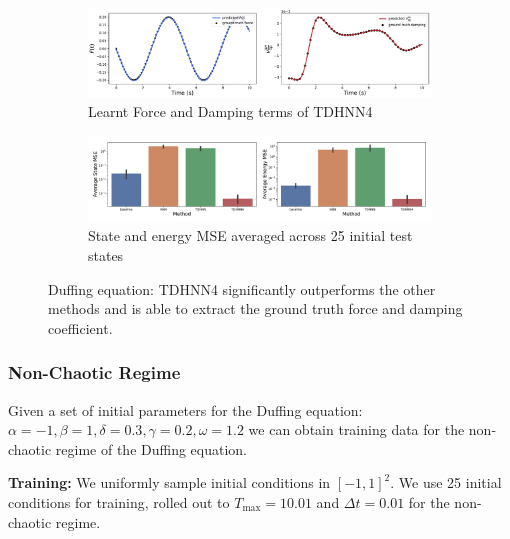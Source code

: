 \documentclass{article}
\begin{document}
\begin{figure}[h!]
\centering
\captionsetup{justification=centering}
	\begin{subfigure}[b]{0.48\textwidth}
		\centering
		\includegraphics[width=\textwidth]{figures/figures/duffing/1/duffing_dpdt_new_0.pdf}
		\caption{Learnt Force and Damping terms of TDHNN4}
	\end{subfigure}
	\begin{subfigure}[b]{0.48\textwidth}
	    \centering
		\includegraphics[width=\textwidth]{figures/figures/duffing/1/duffing_errors_0.pdf}
		\caption{State and energy MSE averaged across 25 initial test states}
	\end{subfigure}
\caption{Duffing equation: TDHNN4 significantly outperforms the other methods and is able to extract the ground truth force and damping coefficient.}
\label{fig.duffing}
\end{figure}

\subsubsection{Non-Chaotic Regime}

Given a set of initial parameters for the Duffing equation: $\alpha =-1,\beta=1,\delta=0.3,\gamma=0.2,\omega=1.2$ we can obtain training data for the non-chaotic regime of the Duffing equation. 

\textbf{Training:} We uniformly sample initial conditions in $[-1,1]^2$. We use 25 initial conditions for training, rolled out to $T_{\max}=10.01$ and $\Delta t =0.01$ for the non-chaotic regime. 
\end{document}
